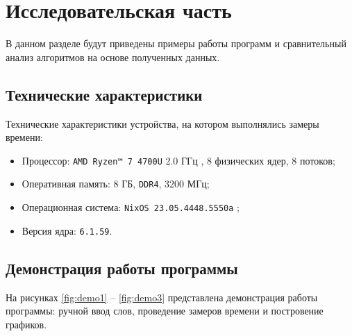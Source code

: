 \section{Исследовательская часть}

В данном разделе будут приведены примеры работы программ и сравнительный анализ алгоритмов на основе полученных данных.

\subsection{Технические характеристики}

Технические характеристики устройства, на котором выполнялись замеры времени:
\begin{itemize}
    \item Процессор: \texttt{AMD Ryzen™ 7 4700U} 2.0 ГГц \cite{amd}, 8 физических ядер, 8 потоков;
    \item Оперативная память: 8 ГБ, \texttt{DDR4}, 3200 МГц;
    \item Операционная система: \texttt{NixOS 23.05.4448.5550a} \cite{nixos};
    \item Версия ядра: \texttt{6.1.59}.
\end{itemize}

\subsection{Демонстрация работы программы}

На рисунках \ref{fig:demo1} -- \ref{fig:demo3} представлена демонстрация работы программы: ручной ввод слов, проведение замеров времени и постровение графиков.

